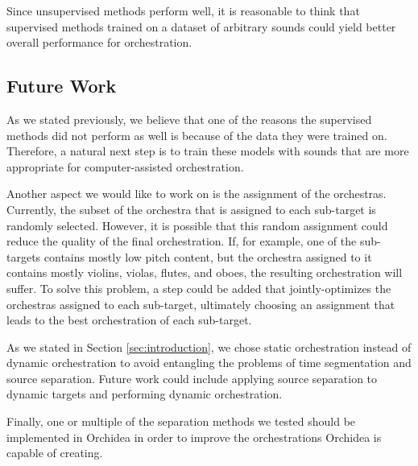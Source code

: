 \documentclass{article}
\begin{document}
	Since unsupervised methods perform well, it is reasonable to think that supervised methods trained on a dataset of arbitrary sounds could yield better overall performance for orchestration.
	
		\subsection{Future Work}\label{sec:futurework}	
		As we stated previously, we believe that one of the reasons the supervised methods did not perform as well is because of the data they were trained on. Therefore, a natural next step is to train these models with sounds that are more appropriate for computer-assisted orchestration.
		
		Another aspect we would like to work on is the assignment of the orchestras. Currently, the subset of the orchestra that is assigned to each sub-target is randomly selected. However, it is possible that this random assignment could reduce the quality of the final orchestration. If, for example, one of the sub-targets contains mostly low pitch content, but the orchestra assigned to it contains mostly violins, violas, flutes, and oboes, the resulting orchestration will suffer. To solve this problem, a step could be added that jointly-optimizes the orchestras assigned to each sub-target, ultimately choosing an assignment that leads to the best orchestration of each sub-target.
		
		As we stated in Section \ref{sec:introduction}, we chose static orchestration instead of dynamic orchestration to avoid entangling the problems of time segmentation and source separation. Future work could include applying source separation to dynamic targets and performing dynamic orchestration.
		
		Finally, one or multiple of the separation methods we tested should be implemented in Orchidea in order to improve the orchestrations Orchidea is capable of creating. 
	
	
	
\end{document}
